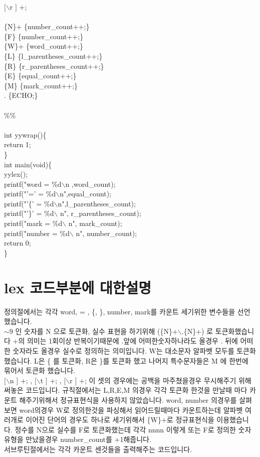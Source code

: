 \documentclass{article}
\begin{document}
$[$$\backslash$r $]$ +; \\ \\
\{N\}+ \{number\_count++;\} \\
\{F\} \{number\_count++;\} \\ 
\{W\}+ \{word\_count++;\} \\
\{L\} \{l\_parentheses\_count++;\} \\
\{R\} \{r\_parentheses\_count++;\} \\
\{E\} \{equal\_count++;\} \\
\{M\} \{mark\_count++;\} \\
. \{ECHO;\} \\ \\
\%\% \\ \\
int yywrap()\{ \\
\indent return 1; \\
\} \\
int main(void)\{ \\
\indent yylex();\\
\indent printf("word = \%d$\backslash$n ,word\_count); \\
\indent printf("'=' = \%d$\backslash$n",equal\_count); \\
\indent printf("'\{' = \%d$\backslash$n",l\_parentheses\_count); \\
\indent printf("'\}' = \%d$\backslash$ n", r\_parentheses\_count); \\
\indent printf("mark = \%d$\backslash$ n", mark\_count); \\
\indent printf("number = \%d$\backslash$ n", number\_count); \\
\indent return 0;\\
\}

\section{lex 코드부분에 대한설명}
\qquad 정의절에서는 각각 word, = , \{, \}, number, mark를 카운트 세기위한 변수들을 선언했습니다. \\ 
$\sim$9 인 숫자를 N 으로 토큰화,  실수 표현을 하기위해
(\{N\}+$\backslash$.\{N\}+) 로 토큰화했습니다 +의 의미는 1회이상 반복이기때문에 .앞에 어떠한숫자하나라도 올경우 . 뒤에 어떠한 숫자라도 올경우 실수로 정의하는 의미입니다.
W는 대소문자 알파벳 모두를 토큰화 했습니다. L은 \{ 를 토큰화, R은 \}를 토큰화 했고 나머지 특수문자들은 M 에 한번에 묶어서 토큰화 했습니다.\\
\indent $[$$\backslash$n $]$ +; , $[$$\backslash$t $]$ +; , $[$$\backslash$r $]$ +; 이 셋의 경우에는 공백을 마주쳤을경우 무시해주기 위해 써놓은 코드입니다. 규칙절에서는 L,R,E,M 의경우 각각 토큰화 한것을 만날때 마다 카운트 해주기위해서 정규표현식을 사용하지 않았습니다. word, number 의경우를 살펴보면 word의경우 W로 정의한것을 파싱해서 읽어드릴때마다 카운트하는데 알파벳 여러개로 이어진 단어의 경우도 하나로 세기위해서 \{W\}+로 정규표현식을 이용했습니다. 정수를 N으로 실수를 F로 토큰화했는데 각각 nnnn 이렇게 또는 F로 정의한 숫자유형을 만났을경우 number\_count를 +1해줍니다. \\
\indent 서브루틴절에서는 각각 카운트 센것들을 출력해주는 코드입니다.
\end{document}
